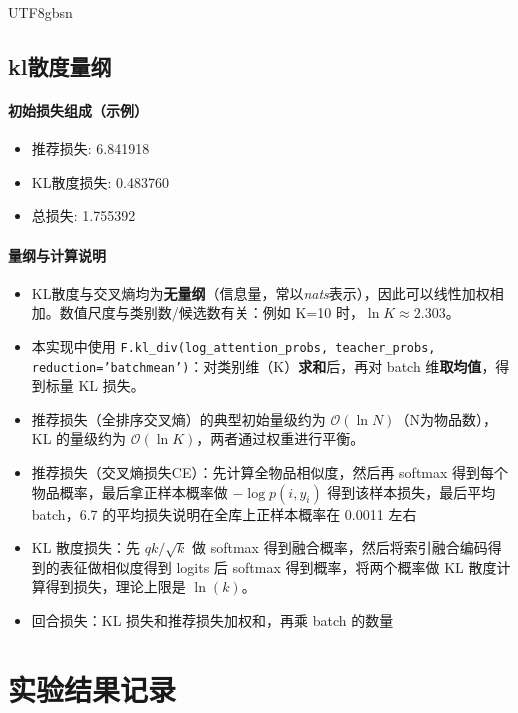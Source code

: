 \documentclass[12pt,a4paper]{article}
\begin{document}
\begin{CJK}{UTF8}{gbsn}
\subsection{kl散度量纲}
\paragraph{初始损失组成（示例）}
\begin{itemize}
    \item 推荐损失: 6.841918
    \item KL散度损失: 0.483760
    \item 总损失: 1.755392
\end{itemize}

\paragraph{量纲与计算说明}
\begin{itemize}
    \item KL散度与交叉熵均为\textbf{无量纲}（信息量，常以\emph{nats}表示），因此可以线性加权相加。数值尺度与类别数/候选数有关：例如 K=10 时，$\ln K\approx2.303$。
    \item 本实现中使用 \texttt{F.kl\_div(log\_attention\_probs, teacher\_probs, reduction='batchmean')}：对类别维（K）\textbf{求和}后，再对 batch 维\textbf{取均值}，得到标量 KL 损失。
    \item 推荐损失（全排序交叉熵）的典型初始量级约为 $\mathcal{O}(\ln N)$（N为物品数），KL 的量级约为 $\mathcal{O}(\ln K)$，两者通过权重进行平衡。
    \item 推荐损失（交叉熵损失CE）：先计算全物品相似度，然后再 softmax 得到每个物品概率，最后拿正样本概率做 $-\log p(i, y_i)$ 得到该样本损失，最后平均 batch，6.7 的平均损失说明在全库上正样本概率在 0.0011 左右
    \item KL 散度损失：先 $qk/\sqrt{k}$ 做 softmax 得到融合概率，然后将索引融合编码得到的表征做相似度得到 logits 后 softmax 得到概率，将两个概率做 KL 散度计算得到损失，理论上限是 $\ln(k)$。
    \item 回合损失：KL 损失和推荐损失加权和，再乘 batch 的数量
  \end{itemize}
\section{实验结果记录}
\end{CJK}
\end{document}
